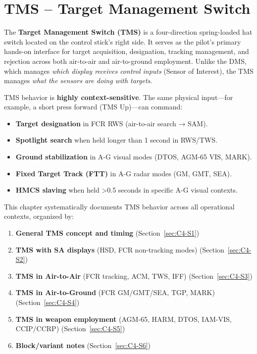 \documentclass[11pt, a4paper, twoside]{report}
\begin{document}
\chapter{TMS -- Target Management Switch}
\label{chap:C4}


The \textbf{Target Management Switch (TMS)} is a four-direction spring-loaded hat switch located on the control stick's right side. It serves as the pilot's primary hands-on interface for target acquisition, designation, tracking management, and rejection across both air-to-air and air-to-ground employment. Unlike the DMS, which manages \textit{which display receives control inputs} (Sensor of Interest), the TMS manages \textit{what the sensors are doing with targets}.

TMS behavior is \textbf{highly context-sensitive}. The same physical input---for example, a short press forward (TMS Up)---can command:
\begin{itemize}
    \item \textbf{Target designation} in FCR RWS (air-to-air search → SAM).
    \item \textbf{Spotlight search} when held longer than 1 second in RWS/TWS.
    \item \textbf{Ground stabilization} in A-G visual modes (DTOS, AGM-65 VIS, MARK).
    \item \textbf{Fixed Target Track (FTT)} in A-G radar modes (GM, GMT, SEA).
    \item \textbf{HMCS slaving} when held >0.5 seconds in specific A-G visual contexts.
\end{itemize}

This chapter systematically documents TMS behavior across all operational contexts, organized by:
\begin{enumerate}
    \item \textbf{General TMS concept and timing} (Section~\ref{sec:C4-S1})
    \item \textbf{TMS with SA displays} (HSD, FCR non-tracking modes) (Section~\ref{sec:C4-S2})
    \item \textbf{TMS in Air-to-Air} (FCR tracking, ACM, TWS, IFF) (Section~\ref{sec:C4-S3})
    \item \textbf{TMS in Air-to-Ground} (FCR GM/GMT/SEA, TGP, MARK) (Section~\ref{sec:C4-S4})
    \item \textbf{TMS in weapon employment} (AGM-65, HARM, DTOS, IAM-VIS, CCIP/CCRP) (Section~\ref{sec:C4-S5})
    \item \textbf{Block/variant notes} (Section~\ref{sec:C4-S6})
\end{enumerate}
\end{document}
